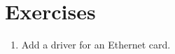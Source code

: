 \section{Exercises}

\begin{enumerate}
  
\item Add a driver for an Ethernet card.

\end{enumerate}
